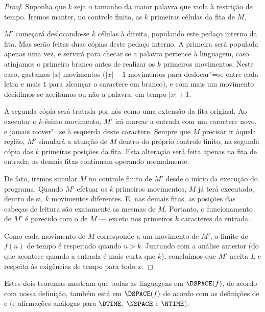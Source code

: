 \begin{proof}
    Suponha que $k$ seja o tamanho da maior palavra
    que viola à restrição de tempo.
    Iremos manter, no controle finito,
    as $k$ primeiras células da fita de $M$.

    $M'$ começará deslocando-se $k$ células à direita,
    populando este pedaço interno da fita.
    Mas serão feitas duas cópias deste pedaço interno.
    A primeira será populada apenas uma vez,
    e servirá para checar se a palavra
    pertence à linguagem,
    caso atinjamos o primeiro branco
    antes de realizar os $k$ primeiros movimentos.
    Neste caso, gastamos $|x|$ movimentos
    ($|x| - 1$ movimentos para deslocar"=se entre cada letra
    e mais $1$ para alcançar o caractere em branco),
    e com mais um movimento
    decidimos se aceitamos ou não a palavra,
    em tempo $|x| + 1$.

    A segunda cópia será tratada por nós
    como uma extensão da fita original.
    Ao executar o $k$-ésimo movimento,
    $M'$ irá marcar a entrada com um caractere novo,
    e jamais mover"=se à esquerda deste caractere.
    Sempre que $M$ precisar ir àquela região,
    $M'$ simulará a atuação de $M$
    dentro do próprio controle finito,
    na segunda cópia das $k$ primeiras posições da fita.
    Esta alteração será feita apenas na fita de entrada;
    as demais fitas continuam operando normalmente.

    De fato, iremos simular $M$ no controle finito de $M'$
    desde o início da execução do programa.
    Quando $M'$ efetuar os $k$ primeiros movimentos,
    $M$ já terá executado, dentro de si,
    $k$ movimentos diferentes.
    E, nas demais fitas, as posições das cabeças de leitura
    são exatamente as mesmas de $M$.
    Portanto,
    o funcionamento de $M'$
    é parecido com o de $M$
    --- exceto nos primeiros $k$ caracteres da entrada.

    Como cada movimento de $M$ corresponde a um movimento de $M'$,
    o limite de $f(n)$ de tempo é respeitado
    quando $n > k$.
    Juntando com a análise anterior
    (do que acontece quando a entrada é mais curta que $k$),
    concluímos que $M'$ aceita $L$ e respeita às exigências de tempo
    para todo $x$.
\end{proof}

Estes dois teoremas mostram que
todas as linguagens em $\DSPACE(f)$,
de acordo com nossa definição,
também está em $\DSPACE(f)$
de acordo com as definições de 
e 
(e afirmações análogas para $\DTIME$, $\NSPACE$ e $\NTIME$).
